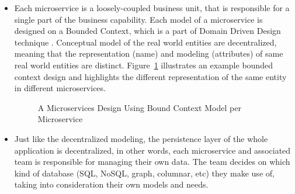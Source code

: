 \documentclass{Configuration_Files/PoliMi3i_thesis}
\begin{document}
\begin{itemize}
    \item Each microservice is a loosely-coupled business unit, that is responsible for a single part of the business capability.
    Each model of a microservice is designed on a Bounded Context, which is a part of Domain Driven Design technique \cite{boundedcontext}. Conceptual model of the real world entities are decentralized, meaning that the representation (name) and modeling (attributes) of same real world entities are distinct. Figure~\ref{fig:micromodel} illustrates an example bounded context design and highlights the different representation of the same entity in different microservices.
    
    \begin{figure}[H]
    \centering
    \quad
    \caption{A Microservices Design Using Bound Context Model per Microservice}
    \label{fig:micromodel}
\end{figure}

    \item Just like the decentralized modeling, the persistence layer of the whole application is decentralized, in other words, each microservice and associated team is responsible for managing their own data. The team decides on which kind of database (SQL, NoSQL, graph, columnar, etc) they make use of, taking into consideration their own models and needs.

\end{itemize}
\end{document}
